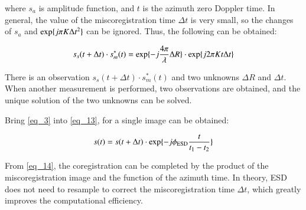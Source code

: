 \documentclass[preprint, authoryear]{elsarticle}
\begin{document}
\noindent where $s_a$ is amplitude function, and $t$ is the azimuth zero Doppler time. In general, the value of the miscoregistration time $\Delta t$ is very small, so the changes of $s_a$ and ${\rm exp} \{ j \pi K \Delta t^2\}$ can be ignored. Thus, the following can be obtained: \par

\begin{equation}
    s_s(t + \Delta t) \cdot s_m^*(t) = {\rm exp} \{-j \frac{4 \pi}{\lambda} \Delta R\} \cdot {\rm exp} \{j 2 \pi K t \Delta t\}
    \label{eq_13}
\end{equation}

\noindent There is an observation $s_s(t + \Delta t) \cdot s_m^*(t)$ and two unknowns $\Delta R$ and $\Delta t$. When another measurement is performed, two observations are obtained, and the unique solution of the two unknowns can be solved. \par
Bring \ref{eq_3} into \ref{eq_13}, for a single image can be obtained: \par

\begin{equation}
    s(t) = s(t + \Delta t) \cdot {\rm exp} \{-j \phi_{\rm ESD} \frac{t}{t_1 - t_2}\}
    \label{eq_14}
\end{equation}

\noindent From \ref{eq_14}, the coregistration can be completed by the product of the miscoregistration image and the function of the azimuth time. In theory, ESD does not need to resample to correct the miscoregistration time $\Delta t$, which greatly improves the computational efficiency. \par
\end{document}
